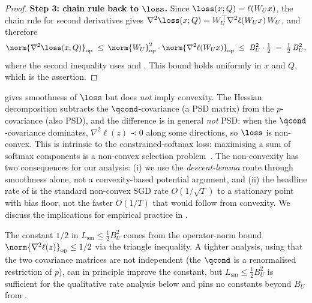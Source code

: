 \begin{proof}
\noindent\textbf{Step 3: chain rule back to $\loss$.}
Since $\loss(x; Q) = \ell(W_U x)$, the chain rule for second derivatives
gives $\nabla^2 \loss(x; Q) = W_U^\top \nabla^2 \ell(W_U x)\, W_U$, and
therefore
\begin{align*}
   \norm{\nabla^2 \loss(x; Q)}_{\mathrm{op}}
   \;\le\; \norm{W_U}_{\mathrm{op}}^2 \cdot \norm{\nabla^2 \ell(W_U x)}_{\mathrm{op}}
   \;\le\; B_U^2 \cdot \tfrac{1}{2}
   \;=\; \tfrac{1}{2}\, B_U^2,
\end{align*}
where the second inequality uses  and
. This bound holds uniformly in $x$ and
$Q$, which is the assertion.
\end{proof}

\begin{remark}\label{rem:smoothness_non_convex}
 gives smoothness of $\loss$ but does \emph{not}
imply convexity. The Hessian decomposition  subtracts
the $\qcond$-covariance (a PSD matrix) from the $p$-covariance (also
PSD), and the difference is in general \emph{not} PSD: when the
$\qcond$-covariance dominates, $\nabla^2 \ell(z) \prec 0$ along some
directions, so $\loss$ is non-convex. This is intrinsic to the
constrained-softmax loss: maximising a sum of softmax components is a
non-convex selection problem~\cite{bottou2018optimization}. The
non-convexity has two consequences for our analysis: (i) we use the
\emph{descent-lemma} route through smoothness alone, not a
convexity-based potential argument, and (ii) the headline rate of
 is the standard non-convex SGD
rate $O(1/\sqrt T)$ to a stationary point with bias floor, not the faster
$O(1/T)$ that would follow from convexity. We discuss the
implications for empirical practice in .
\end{remark}

\begin{remark}\label{rem:smoothness_constant_tightness}
The constant $1/2$ in $L_{\mathrm{sm}} \le \tfrac{1}{2} B_U^2$ comes from
the operator-norm bound $\norm{\nabla^2 \ell(z)}_{\mathrm{op}} \le 1/2$
via the triangle inequality. A tighter analysis, using that the two
covariance matrices are not independent (the $\qcond$ is a renormalised
restriction of $p$), can in principle improve the constant, but
$L_{\mathrm{sm}} \le \tfrac{1}{2} B_U^2$ is sufficient for the
qualitative rate analysis below and pins no constants beyond
$B_U$ from .
\end{remark}
